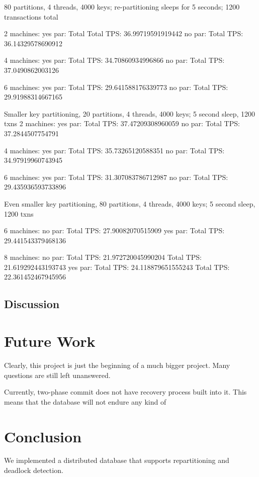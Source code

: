 \documentclass[a4paper, 10pt, notitlepage]{report}
\begin{document}

80 partitions, 4 threads, 4000 keys; re-partitioning sleeps for 5 seconds; 1200 transactions total

2 machines:
yes par: Total Total TPS: 36.99719591919442
no par: Total TPS: 36.14329578690912

4 machines:
yes par: Total TPS: 34.70860934996866
no par: Total TPS: 37.0490862003126

6 machines:
yes par: Total TPS: 29.641588176339773
no par: Total TPS: 29.91988314667165

Smaller key partitioning, 20 partitions, 4 threads, 4000 keys; 5 second sleep, 1200 txns
2 machines:
yes par: Total TPS: 37.47209308960059
no par: Total TPS: 37.2844507754791

4 machines:
yes par: Total TPS: 35.73265120588351
no par: Total TPS: 34.97919960743945

6 machines:
yes par: Total TPS: 31.307083786712987
no par: Total TPS: 29.435936593733896

Even smaller key partitioning, 80 partitions, 4 threads, 4000 keys; 5 second sleep, 1200 txns

6 machines:
no par: Total TPS: 27.90082070515909
yes par: Total TPS: 29.441543379468136

8 machines:
no par: 
Total TPS: 21.972720045990204
Total TPS: 21.619292443193743
yes par: 
Total TPS: 24.118879651555243
Total TPS: 22.361452467945956


\subsection*{Discussion}

\section*{Future Work}

Clearly, this project is just the beginning of a much bigger project. Many questions are still left unanswered. 

Currently, two-phase commit does not have recovery process built into it. This means that the database will not
endure any kind of 



\section*{Conclusion}
We implemented a distributed database that supports repartitioning and deadlock detection.
\end{document}
